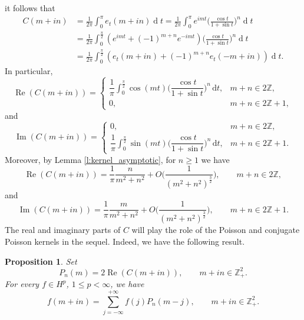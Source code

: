 \documentclass[12pt,a4paper,reqno]{amsart}
\newtheorem{prop}[thm]{Proposition}
\theoremstyle{definition}
\theoremstyle{definition}\newtheorem{defn}[thm]{Definition}
\begin{document}
    it follows that
    \begin{align*}
      C(m+in)&=\frac{1}{2\pi}\int_0^\pi e_t(m+in)\operatorname{d}\!t=\frac{1}{2\pi}\int_0^{\pi} e^{imt}\Big(\frac{\cos t}{1+\sin t}\Big)^n\operatorname{d}\!t\\
      &=\frac{1}{2\pi}\int_0^{\frac\pi 2}(e^{imt}+(-1)^{m+n}e^{-imt})\Big(\frac{\cos t}{1+\sin t}\Big)^n\operatorname{d}\!t\\
      &=\frac{1}{2\pi}\int_0^{\frac{\pi}{2}}(e_t(m+in)+(-1)^{m+n}e_t(-m+in))\operatorname{d}\!t.
      \end{align*}
    In particular,
    \begin{equation}\label{eq:poisson_kernel}
     \operatorname{Re}(C(m+in))=\begin{cases}
          \dfrac{1}{\pi}\displaystyle\int_0^{\frac\pi 2} \cos(mt)\Big(\dfrac{\cos t}{1+\sin t}\Big)^n\,\mathrm{d}t,
          & m+n\in 2\mathbb Z,\\
          0, & m+n\in 2\mathbb Z+1,
      \end{cases}  
    \end{equation}
    and 
    \begin{equation}\label{eq:poisson_conjugate}
    \operatorname{Im}(C(m+in))=\begin{cases}
        0, & m+n\in 2\mathbb Z,\\
        \dfrac{1}{\pi}\displaystyle\int_0^{\frac\pi 2} \sin(mt)\Big(\dfrac{\cos t}{1+\sin t}\Big)^n\,\mathrm{d}t,
            & m+n\in 2\mathbb Z+1.
    \end{cases}    
    \end{equation}
    Moreover, by Lemma \ref{l:kernel_asymptotic}, for $n\geqslant 1$ we have
    \begin{equation*}
     \operatorname{Re}(C(m+in))=\frac{1}{\pi} \frac{n}{m^2+n^2}+O\Big(\frac{1}{(m^2+n^2)^{\frac 32}}\Big),\qquad m+n\in 2\mathbb Z,
    \end{equation*}
    and
    \begin{equation*}
    \operatorname{Im}(C(m+in))= \frac{1}{\pi}\frac{m}{m^2+n^2}+O\Big(\frac{1}{(m^2+n^2)^{\frac 32}}\Big), \qquad m+n\in 2\mathbb Z+1.
    \end{equation*}
    The real and imaginary parts of \(C\) will play the role of the Poisson and
    conjugate Poisson kernels in the sequel. Indeed, we have the following result.
    
    \begin{prop} \label{p:reproducing_poisson}
    Set 
    \[
    P_n(m)=2\operatorname{Re}(C(m+in)),\qquad  m+in\in\mathbb Z^2_+.
    \]
    For every $f\in H^p$, $1\leqslant p<\infty$, we have
    \[
    f(m+in)= \sum_{j=-\infty}^{+\infty}f(j)P_n(m-j), \qquad m+in\in\mathbb{Z}^2_+.
    \]
    \end{prop}
    
\end{document}
